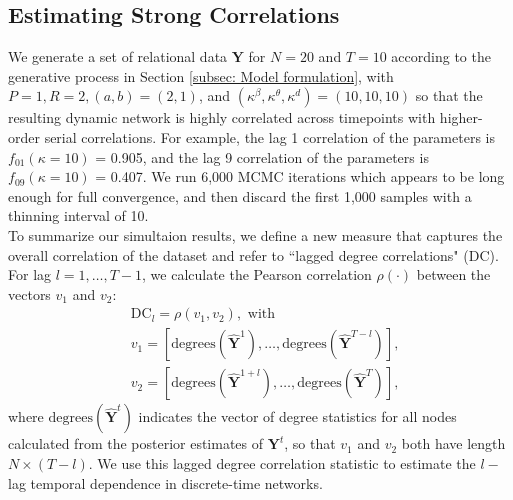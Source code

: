 \documentclass[a4paper]{article}
\begin{document}
\subsection{Estimating Strong Correlations} \label{subsec: correlation}
We generate a set of relational data $\mathbf{Y}$ for $N=20$ and $T=10$ according to the generative process in Section \ref{subsec: Model formulation}, with $P=1, R=2, (a, b) = (2, 1)$, and $(\kappa^\beta, \kappa^\theta, \kappa^d) = (10, 10, 10)$ so that the resulting dynamic network is highly correlated across timepoints with higher-order serial correlations. For example, the lag 1 correlation of the parameters is $f_{01}(\kappa = 10)$ = 0.905, and the lag 9 correlation of the parameters is $f_{09}(\kappa = 10)$ = 0.407. We run 6,000 MCMC iterations which appears to be long enough for full convergence, and then discard the first 1,000 samples with a thinning interval of 10.\\\newline
To summarize our simultaion results, we define a new measure that captures the overall correlation of the dataset and refer to ``lagged degree correlations" (DC). For lag $l=1,\ldots, T-1$, we calculate the Pearson correlation $\rho(\cdot)$ between the vectors $v_1$ and $v_2$:
\begin{equation}
\begin{aligned}
&\mbox{DC}_l = \rho(v_1, v_2), \mbox{ with } \\
&v_1 = [\mbox{degrees}(\hat{\mathbf{Y}}^1), \ldots, \mbox{degrees}(\hat{\mathbf{Y}}^{T-l})],\\
&v_2 = [\mbox{degrees}(\hat{\mathbf{Y}}^{1+l}), \ldots, \mbox{degrees}(\hat{\mathbf{Y}}^{T})],
\end{aligned}
\label{eqn:dc}
	\end{equation}
where $\mbox{degrees}(\hat{\mathbf{Y}}^{t})$ indicates the vector of degree statistics for all nodes calculated from the posterior estimates of  ${\mathbf{Y}}^{t}$, so that $v_1$ and $v_2$ both have length $N \times (T-l)$. We use this lagged degree correlation statistic to estimate the $l-$lag temporal dependence in discrete-time networks.  \\ \newline
\end{document}
